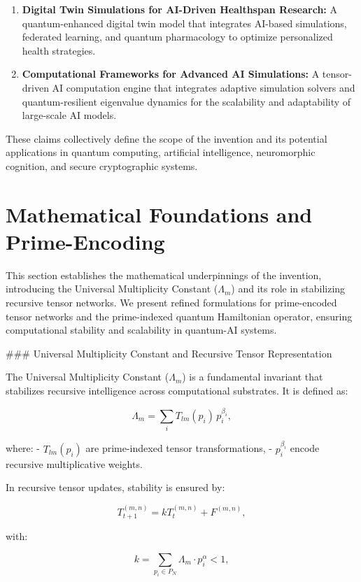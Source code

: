 \documentclass{article}
\theoremstyle{plain}
\begin{document}
\begin{enumerate}
    \item \textbf{Digital Twin Simulations for AI-Driven Healthspan Research:} A quantum-enhanced digital twin model that integrates AI-based simulations, federated learning, and quantum pharmacology to optimize personalized health strategies.
    
    \item \textbf{Computational Frameworks for Advanced AI Simulations:} A tensor-driven AI computation engine that integrates adaptive simulation solvers and quantum-resilient eigenvalue dynamics for the scalability and adaptability of large-scale AI models.
\end{enumerate}

These claims collectively define the scope of the invention and its potential applications in quantum computing, artificial intelligence, neuromorphic cognition, and secure cryptographic systems.


\section{Mathematical Foundations and Prime-Encoding}
\label{sec:math_foundations}

This section establishes the mathematical underpinnings of the invention, introducing the Universal Multiplicity Constant (\(\Lambda_m\)) and its role in stabilizing recursive tensor networks. We present refined formulations for prime-encoded tensor networks and the prime-indexed quantum Hamiltonian operator, ensuring computational stability and scalability in quantum-AI systems.

### Universal Multiplicity Constant and Recursive Tensor Representation

The Universal Multiplicity Constant (\(\Lambda_m\)) is a fundamental invariant that stabilizes recursive intelligence across computational substrates. It is defined as:

\[
\Lambda_m = \sum_{i} T_{lm}(p_i) \, p_i^{\beta_i},
\]

where:
- \( T_{lm}(p_i) \) are prime-indexed tensor transformations,
- \( p_i^{\beta_i} \) encode recursive multiplicative weights.

In recursive tensor updates, stability is ensured by:

\[
T_{t+1}^{(m,n)} = k T_t^{(m,n)} + F^{(m,n)},
\]

with:

\[
k = \sum_{p_i \in P_N} \Lambda_m \cdot p_i^\alpha < 1,
\]
\end{document}
